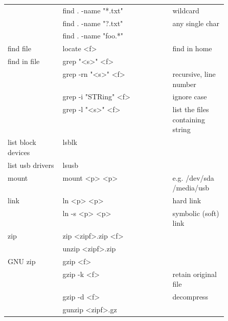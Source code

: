 {\begin{tabularx}{\linewidth}{@{} p{0.25\linewidth}>{\ttfamily}lp{0.25\linewidth} @{}}
                             & find . -name "*.txt"       & wildcard                         \\
                             & find . -name "?.txt"       & any single char                  \\
                             & find . -name "foo.*"       &                                  \\
        find file            & locate <f>                 & find in home                     \\
        find in file         & grep "<s>" <f>             &                                  \\
                             & grep -rn "<s>" <f>         & recursive, line number           \\
                             & grep -i "STRing" <f>       & ignore case                      \\
                             & grep -l "<s>" <f>          & list the files containing string \\
        list block devices   & lsblk                      &                                  \\
        list usb drivers     & lsusb                      &                                  \\
        mount                & mount <p> <p>              & e.g. /dev/sda /media/usb         \\
        link                 & ln <p> <p>                 & hard link                        \\
                             & ln -s <p> <p>              & symbolic (soft) link             \\
        zip                  & zip <zipf>.zip <f>         &                                  \\
                             & unzip <zipf>.zip           &                                  \\
        GNU zip              & gzip <f>                   &                                  \\
                             & gzip -k <f>                & retain original file             \\
                             & gzip -d <f>                & decompress                       \\
                             & gunzip <zipf>.gz           &                                  \\
    \end{tabularx}

}
